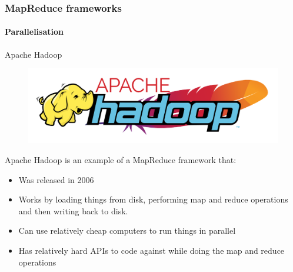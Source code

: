 \documentclass[aspectratio=169,usenames,dvipsnames]{beamer}
\begin{document}
    \begin{frame}
        \frametitle{MapReduce frameworks}
        \framesubtitle{Parallelisation}
        \begin{block}{Apache Hadoop}
        \begin{figure}
        \vspace{-1.2\baselineskip}
        \includegraphics[width=1\linewidth]{figures/hadoop.png}
        \end{figure}
        Apache Hadoop is an example of a MapReduce framework that:
        \begin{itemize}
            \item Was \alert{released in 2006}
            \item Works by loading things \alert{from disk}, performing map and reduce operations and then \alert{writing back to disk}.
            \item Can use relatively \alert{cheap computers} to run things in \alert{parallel}
            \item Has relatively \alert{hard APIs to code against} while doing the map and reduce operations
        \end{itemize}
        \end{block}
    \end{frame}
\end{document}
